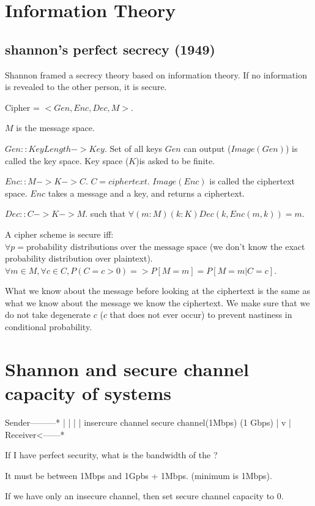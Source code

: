\section{Information Theory}

\subsection{shannon's perfect secrecy (1949)}
Shannon framed a secrecy theory based on information theory. If no
information is revealed to the other person, it is secure.

Cipher = $<Gen, Enc, Dec, M>$.

$M$ is the message space.

$Gen :: KeyLength -> Key$. Set of all keys $Gen$ can output
($Image(Gen)$) is called the key space. Key space ($K$)is asked to be finite.


$Enc :: M -> K -> C$. $C = ciphertext$. $Image(Enc)$ is called the ciphertext space.
$Enc$ takes a message and a key, and returns a ciphertext.

$Dec :: C -> K -> M$. such that $\forall (m: M) (k: K) Dec(k, Enc (m, k)) = m$.

 
A cipher scheme is secure iff: $\forall p = \text{probability distributions over the message space}$
(we don't know the exact probability distribution over
plaintext).
$\forall m \in M, \forall c \in C, P(C = c > 0) => P[M=m] = P[M=m | C=c]$.

What we know about the message before looking at the
ciphertext is the same as what we know about the message  we know the ciphertext.
We make sure that we do not take degenerate $c$ ($c$ that does not ever occur) to prevent nastiness in
conditional probability.

\section{Shannon and secure channel capacity of systems}

        Sender---------*
        |              |
        |              |
 insercure channel secure channel(1Mbps)
     (1 Gbps)          |
        v              |
        Receiver<------*

If I have perfect security, what is the bandwidth of the ?

It must be between 1Mbps and 1Gpbs + 1Mbps. (minimum is 1Mbps).

If we have only an insecure channel, then set secure channel capacity to 0.

